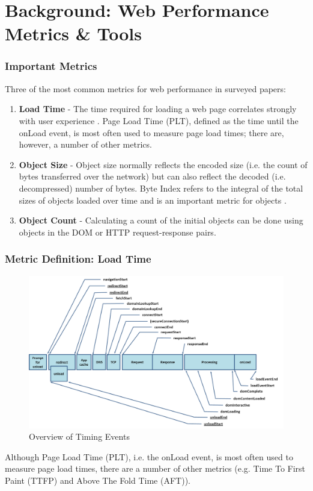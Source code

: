 \section{Background: Web Performance Metrics \& Tools}

\begin{frame}
    \frametitle{Important Metrics}
	Three of the most common metrics for web performance in surveyed papers:
	\begin{enumerate}
	  \item \textbf{Load Time} - The time required for loading a web page correlates strongly with user experience \cite{6263888}. Page Load Time (PLT), defined as the time until the onLoad event, is most often used to measure page load times; there are, however, a number of other metrics.
	  \item \textbf{Object Size} - Object size normally reflects the encoded size (i.e. the count of bytes transferred over the network) but can also reflect the decoded (i.e. decompressed) number of bytes. Byte Index refers to the integral of the total sizes of objects loaded over time and is an important metric for objects \cite{10.1145/2940136.2940138}.
	  \item \textbf{Object Count} - Calculating a count of the initial objects can be done using objects in the DOM or HTTP request-response pairs.
	\end{enumerate}
\end{frame}

\begin{frame}
    \frametitle{Metric Definition: Load Time}
	\begin{figure}
			\centering
			\includegraphics[width=.7\textwidth,keepaspectratio]{pics/timing-overview.png}
		\caption{Overview of Timing Events \cite{timing_2012}}
		\label{fig:timing_event}
	\end{figure}
Although Page Load Time (PLT), i.e. the onLoad event, is most often used to measure page load times, there are a number of other metrics (e.g. Time To First Paint (TTFP) and Above The Fold Time (AFT)).
	
\end{frame}


